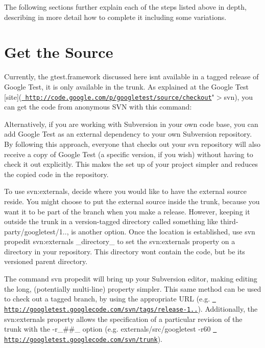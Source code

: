 The following sections further explain each of the steps listed above in depth, describing in more detail how to complete it including some variations.

\section*{Get the Source}

Currently, the gtest.\+framework discussed here isn\textquotesingle{}t available in a tagged release of Google Test, it is only available in the trunk. As explained at the Google Test \mbox{[}site\mbox{]}(\href{http://code.google.com/p/googletest/source/checkout}\texttt{ http\+://code.\+google.\+com/p/googletest/source/checkout}"$>$svn), you can get the code from anonymous S\+VN with this command\+:


\begin{DoxyCode}{0}
\end{DoxyCode}


Alternatively, if you are working with Subversion in your own code base, you can add Google Test as an external dependency to your own Subversion repository. By following this approach, everyone that checks out your svn repository will also receive a copy of Google Test (a specific version, if you wish) without having to check it out explicitly. This makes the set up of your project simpler and reduces the copied code in the repository.

To use {\ttfamily svn\+:externals}, decide where you would like to have the external source reside. You might choose to put the external source inside the trunk, because you want it to be part of the branch when you make a release. However, keeping it outside the trunk in a version-\/tagged directory called something like {\ttfamily third-\/party/googletest/1..}, is another option. Once the location is established, use {\ttfamily svn propedit svn\+:externals \+\_\+directory\+\_\+} to set the svn\+:externals property on a directory in your repository. This directory won\textquotesingle{}t contain the code, but be its versioned parent directory.

The command {\ttfamily svn propedit} will bring up your Subversion editor, making editing the long, (potentially multi-\/line) property simpler. This same method can be used to check out a tagged branch, by using the appropriate U\+RL (e.\+g. {\ttfamily \href{http://googletest.googlecode.com/svn/tags/release-1.0.1}\texttt{ http\+://googletest.\+googlecode.\+com/svn/tags/release-\/1..}}). Additionally, the svn\+:externals property allows the specification of a particular revision of the trunk with the {\ttfamily -\/r\+\_\+\#\#\+\_\+} option (e.\+g. {\ttfamily externals/src/googletest -\/r60 \href{http://googletest.googlecode.com/svn/trunk}\texttt{ http\+://googletest.\+googlecode.\+com/svn/trunk}}).

